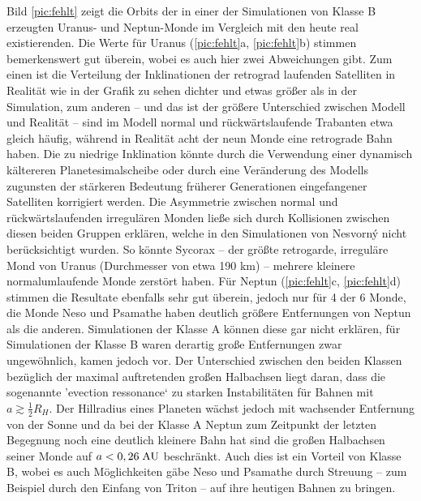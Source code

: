 \documentclass[10pt,a4paper,twoside]{article}
\begin{document}
Bild \ref{pic:fehlt} zeigt die Orbits der in einer der Simulationen von Klasse B erzeugten Uranus- und Neptun-Monde im Vergleich mit den heute real existierenden. %
Die Werte für Uranus (\ref{pic:fehlt}a, \ref{pic:fehlt}b) stimmen bemerkenswert gut überein, wobei es auch hier zwei %
Abweichungen gibt. Zum einen ist die Verteilung der Inklinationen der retrograd laufenden Satelliten in Realität wie in der Grafik zu sehen dichter und etwas größer als in der Simulation, 
zum anderen – und das ist der größere Unterschied zwischen Modell und Realität – sind im Modell normal und rückwärtslaufende Trabanten etwa gleich häufig, während in Realität acht der neun Monde eine retrograde Bahn haben\cite{Nesvorny2007}.
Die zu niedrige Inklination könnte durch die Verwendung einer dynamisch kältereren Planetesimalscheibe oder durch eine Veränderung des Modells zugunsten der stärkeren Bedeutung früherer Generationen eingefangener Satelliten korrigiert werden\cite{Nesvorny2007}. %
Die Asymmetrie zwischen normal und rückwärtslaufenden irregulären Monden ließe sich durch Kollisionen zwischen diesen beiden Gruppen erklären, welche in den Simulationen von Nesvorný nicht berücksichtigt wurden. So könnte Sycorax – der größte retrogarde, irreguläre Mond von Uranus (Durchmesser von etwa 190 km) – mehrere kleinere normalumlaufende Monde zerstört haben\cite{Nesvorny2007}. %
Für Neptun (\ref{pic:fehlt}c, \ref{pic:fehlt}d) stimmen die Resultate ebenfalls sehr gut überein, jedoch nur für 4 der 6 Monde, die Monde Neso und Psamathe haben deutlich größere Entfernungen von Neptun als die anderen\cite{Nesvorny2007}.
Simulationen der Klasse A können diese gar nicht erklären, für Simulationen der Klasse B waren derartig große Entfernungen zwar ungewöhnlich, kamen jedoch vor.
Der Unterschied zwischen den beiden Klassen bezüglich der maximal auftretenden großen Halbachsen liegt daran, dass die sogenannte 'evection ressonance` zu starken Instabilitäten für Bahnen mit $a \gtrsim \frac{1}{2} R_H$\cite{Nesvorny2007}. %
Der Hillradius eines Planeten wächst jedoch mit wachsender Entfernung von der Sonne und da bei der Klasse A Neptun zum Zeitpunkt der letzten Begegnung noch eine deutlich kleinere Bahn hat sind die großen Halbachsen seiner Monde auf $a < 0,26 \;\mathrm{AU}$ beschränkt\cite{Nesvorny2007}.
Auch dies ist ein Vorteil von Klasse B, wobei es auch Möglichkeiten gäbe Neso und Psamathe durch Streuung – zum Beispiel durch den Einfang von Triton – auf ihre heutigen Bahnen zu bringen. %
\end{document}
